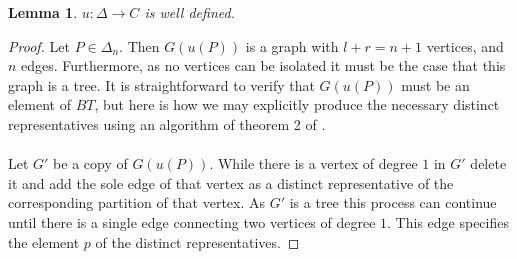 \documentclass[11pt]{amsart}
\newtheorem{lemma}[thm]{Lemma}
\theoremstyle{definition}
\theoremstyle{remark}
\numberwithin{equation}{section}
\newcommand{\EC}{C}
\newcommand{\OP}{\Delta}
\newcommand{\0}{\color{blue}{\mathsf{0}}}
\begin{document}
\begin{lemma} \label{u well defined}
$u:\OP \to \EC$ is well defined.
\end{lemma}
\begin{proof}
Let $P \in \OP_n$. Then $G(u(P))$ is a graph with $l+r=n+1$ vertices, and $n$ edges. Furthermore, as no vertices can be isolated it must be the case that this graph is a tree. It is straightforward to verify that $G(u(P))$ must be an element of $BT$, but here is how we may explicitly produce the necessary distinct representatives using an algorithm of theorem 2 of \cite{kajitani1982number}.
\\\\
Let $G'$ be a copy of $G(u(P))$. While there is a vertex of degree $1$ in $G'$ delete it and add the sole edge of that vertex as a distinct representative of the corresponding partition of that vertex. As $G'$ is a tree this process can continue until there is a single edge connecting two vertices of degree $1$. This edge specifies the element $p$ of the distinct representatives.
\end{proof}
\end{document}
